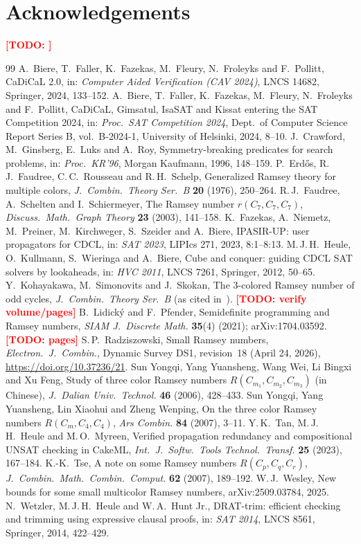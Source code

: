 \documentclass[11pt]{amsart}
\newcommand{\TODO}[1]{\textcolor{red}{\textbf{[TODO: #1]}}}
\theoremstyle{definition}
\theoremstyle{remark}
\begin{document}
\section*{Acknowledgements}
\TODO{}

\begin{thebibliography}{99}
 A.~Biere, T.~Faller, K.~Fazekas, M.~Fleury, N.~Froleyks and F.~Pollitt, CaDiCaL 2.0, in: \emph{Computer Aided
Verification (CAV 2024)}, LNCS 14682, Springer, 2024, 133--152.
 A.~Biere, T.~Faller, K.~Fazekas, M.~Fleury, N.~Froleyks and F.~Pollitt, CaDiCaL, Gimsatul, IsaSAT and Kissat entering
the SAT Competition 2024, in: \emph{Proc.\ SAT Competition 2024}, Dept.\ of Computer Science Report Series B, vol.\ B-2024-1,
University of Helsinki, 2024, 8--10.
 J.~Crawford, M.~Ginsberg, E.~Luks and A.~Roy, Symmetry-breaking predicates for search problems, in: \emph{Proc.\ KR'96},
Morgan Kaufmann, 1996, 148--159.
 P.~Erd\H{o}s, R.\,J.~Faudree, C.\,C.~Rousseau and R.\,H.~Schelp, Generalized Ramsey theory for multiple colors,
\emph{J.\ Combin.\ Theory Ser.\ B} \textbf{20} (1976), 250--264.
 R.\,J.~Faudree, A.~Schelten and I.~Schiermeyer, The Ramsey number $r(C_7,C_7,C_7)$, \emph{Discuss.\ Math.\ Graph
Theory} \textbf{23} (2003), 141--158.
 K.~Fazekas, A.~Niemetz, M.~Preiner, M.~Kirchweger, S.~Szeider and A.~Biere, IPASIR-UP: user propagators for CDCL,
in: \emph{SAT 2023}, LIPIcs 271, 2023, 8:1--8:13.
 M.\,J.\,H.~Heule, O.~Kullmann, S.~Wieringa and A.~Biere, Cube and conquer: guiding CDCL SAT solvers by lookaheads,
in: \emph{HVC 2011}, LNCS 7261, Springer, 2012, 50--65.
 Y.~Kohayakawa, M.~Simonovits and J.~Skokan, The 3-colored Ramsey number of odd cycles, \emph{J.\ Combin.\ Theory Ser.\ B}
(as cited in~\cite{Rad}). \TODO{verify volume/pages}
 B.~Lidick\'y and F.~Pfender, Semidefinite programming and Ramsey numbers, \emph{SIAM J.\ Discrete Math.} \textbf{35}(4)
(2021); arXiv:1704.03592. \TODO{pages}
 S.\,P.~Radziszowski, Small Ramsey numbers, \emph{Electron.\ J.\ Combin.}, Dynamic Survey DS1, revision~18 (April 24,
2026), \url{https://doi.org/10.37236/21}.
 Sun Yongqi, Yang Yuansheng, Wang Wei, Li Bingxi and Xu Feng, Study of three color Ramsey numbers
$R(C_{m_1},C_{m_2},C_{m_3})$ (in Chinese), \emph{J.\ Dalian Univ.\ Technol.} \textbf{46} (2006), 428--433.
 Sun Yongqi, Yang Yuansheng, Lin Xiaohui and Zheng Wenping, On the three color Ramsey numbers $R(C_m,C_4,C_4)$,
\emph{Ars Combin.} \textbf{84} (2007), 3--11.
 Y.\,K.~Tan, M.\,J.\,H.~Heule and M.\,O.~Myreen, Verified propagation redundancy and compositional UNSAT checking in
CakeML, \emph{Int.\ J.\ Softw.\ Tools Technol.\ Transf.} \textbf{25} (2023), 167--184.
 K.-K.~Tse, A note on some Ramsey numbers $R(C_p,C_q,C_r)$, \emph{J.\ Combin.\ Math.\ Combin.\ Comput.} \textbf{62}
(2007), 189--192.
 W.\,J.~Wesley, New bounds for some small multicolor Ramsey numbers, arXiv:2509.03784, 2025.
 N.~Wetzler, M.\,J.\,H.~Heule and W.\,A.~Hunt Jr., DRAT-trim: efficient checking and trimming using expressive
clausal proofs, in: \emph{SAT 2014}, LNCS 8561, Springer, 2014, 422--429.
\end{thebibliography}
\end{document}
